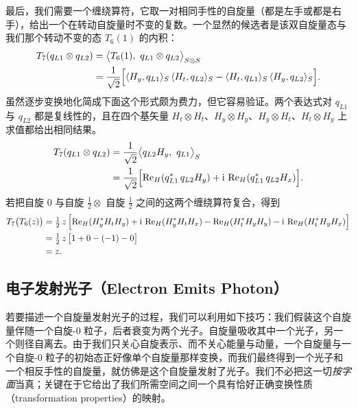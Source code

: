 最后，我们需要一个缠绕算符，它取一对相同手性的自旋量（都是左手或都是右手），给出一个在转动自旋量时不变的复数。一个显然的候选者是该双自旋量态与我们那个转动不变的态 $T_6(1)$ 的内积：
\begin{align*}
T_7(q_{L1}\otimes q_{L2})
&= \bigl\langle T_6(1),\ q_{L1}\otimes q_{L2}\bigr\rangle_{S\otimes S}\\
&= \frac{1}{\sqrt2}\Bigl[\langle H_y,q_{L1}\rangle_S\,\langle H_t,q_{L2}\rangle_S
-\langle H_t,q_{L1}\rangle_S\,\langle H_y,q_{L2}\rangle_S\Bigr].
\end{align*}
虽然逐步变换地化简成下面这个形式颇为费力，但它容易验证。两个表达式对 $q_{L1}$ 与 $q_{L2}$ 都是复线性的，且在四个基矢量 $H_t\otimes H_t$、$H_y\otimes H_y$、$H_y\otimes H_t$、$H_t\otimes H_y$ 上求值都给出相同结果。
\begin{align*}
T_7(q_{L1}\otimes q_{L2})
&= \frac{1}{\sqrt2}\bigl\langle q_{L2} H_y,\ q_{L1}\bigr\rangle_S\\
&= \frac{1}{\sqrt2}\Bigl[\operatorname{Re}_H(q_{L1}^*\,q_{L2} H_y)+\mathrm{i}\,\operatorname{Re}_H(q_{L1}^*\,q_{L2} H_x)\Bigr].
\end{align*}
若把自旋 0 与自旋 $\tfrac12\otimes$ 自旋 $\tfrac12$ 之间的这两个缠绕算符复合，得到
\begin{align*}
T_7\bigl(T_6(z)\bigr)
&= \tfrac12\,z\,\Bigl[\operatorname{Re}_H(H_y^* H_t H_y)+\mathrm{i}\,\operatorname{Re}_H(H_y^* H_t H_x)
-\operatorname{Re}_H(H_t^* H_y H_y)-\mathrm{i}\,\operatorname{Re}_H(H_t^* H_y H_x)\Bigr]\\
&= \tfrac12\,z\,\bigl[1+0-(-1)-0\bigr]\\
&= z .
\end{align*}

\subsection{电子发射光子（Electron Emits Photon）}


若要描述一个自旋量发射光子的过程，我们可以利用如下技巧：我们假装这个自旋量伴随一个自旋-0 粒子，后者衰变为两个光子。自旋量吸收其中一个光子，另一个则径自离去。由于我们只关心自旋表示、而不关心能量与动量，一个自旋量与一个自旋-0 粒子的初始态正好像单个自旋量那样变换，而我们最终得到一个光子和一个相反手性的自旋量，就仿佛是这个自旋量发射了光子。我们不必把这一切\emph{按字面}当真；关键在于它给出了我们所需空间之间一个具有恰好正确变换性质（transformation properties）的映射。

